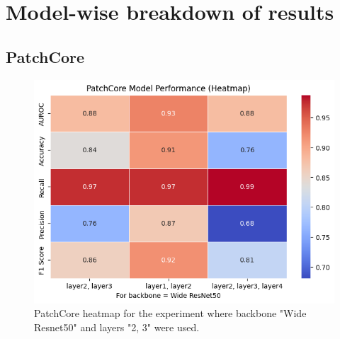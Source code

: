 \section{Model-wise breakdown of results}

\subsection*{PatchCore}

\begin{figure}[H]
    \centering
    \includegraphics[width=1\linewidth]{Rohit_Master_Thesis//Images/patchcore heatmap.png}
    \caption{PatchCore heatmap for the experiment where backbone "Wide Resnet50" and layers "2, 3" were used.}
    \label{fig:patchcore heatmap}
\end{figure}

